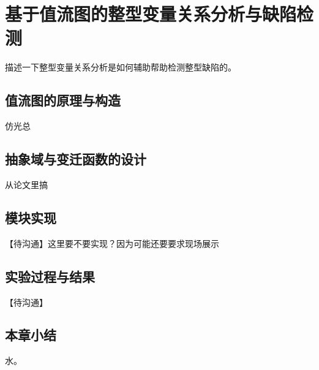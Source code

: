 
\chapter{基于值流图的整型变量关系分析与缺陷检测}

描述一下整型变量关系分析是如何辅助帮助检测整型缺陷的。

\section{值流图的原理与构造}

仿光总

\section{抽象域与变迁函数的设计}

从论文里搞

\section{模块实现}

【待沟通】这里要不要实现？因为可能还要要求现场展示

\section{实验过程与结果}

【待沟通】

\section{本章小结}

水。